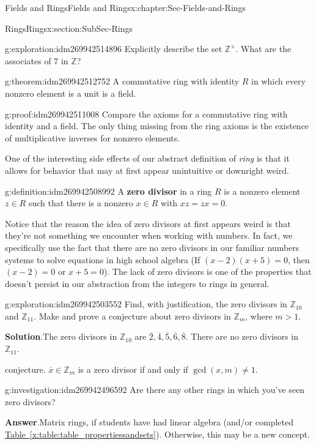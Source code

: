 \documentclass[oneside,10pt,]{book}
\newcommand{\terminology}[1]{\textbf{#1}}
\numberwithin{equation}{section}
\def\Z{{\mathbb Z}}
\begin{document}
\begin{chapterptx}{Fields and Rings}{}{Fields and Rings}{}{}{x:chapter:Sec-Fields-and-Rings}
\begin{sectionptx}{Rings}{}{Rings}{}{}{x:section:SubSec-Rings}
\begin{exploration}{}{g:exploration:idm269942514896}
Explicitly describe the set \(\Z^\times\). What are the associates of 7 in \(\Z\)?%
\end{exploration}
\begin{theorem}{}{}{g:theorem:idm269942512752}%
A commutative ring with identity \(R\) in which every nonzero element is a unit is a field.%
\end{theorem}
\begin{proofptx}{}{g:proof:idm269942511008}
Compare the axioms for a commutative ring with identity and a field. The only thing missing from the ring axioms is the existence of multiplicative inverses for nonzero elements.%
\end{proofptx}
One of the interesting side effects of our abstract definition of \emph{ring} is that it allows for behavior that may at first appear unintuitive or downright weird.%
\begin{definition}{}{g:definition:idm269942508992}%
A \terminology{zero divisor} in a ring \(R\) is a nonzero element \(z\in R\) such that there is a nonzero \(x\in R\) with \(xz = zx = 0\).%
\end{definition}
Notice that the reason the idea of zero divisors at first appears weird is that they're not something we encounter when working with numbers. In fact, we specifically use the fact that there are no zero divisors in our familiar numbers systems to solve equations in high school algebra (If \((x-2)(x+5)=0\), then \((x-2)=0\) or \(x+5=0\)). The lack of zero divisors is one of the properties that doesn't persist in our abstraction from the integers to rings in general.%
\begin{exploration}{}{g:exploration:idm269942503552}%
Find, with justification, the zero divisors in \(\Z_{10}\) and \(\Z_{11}\). Make and prove a conjecture about zero divisors in \(\Z_m\), where \(m > 1\).%
\par\smallskip%
\noindent\textbf{Solution}.\hypertarget{g:solution:idm269942500656}{}\quad{}The zero divisors in \(\Z_{10}\) are \(\overline{2}, \overline{4}, \overline{5}, \overline{6},\overline{8}\). There are no zero divisors in \(\Z_{11}\).%
\par
conjecture. \(\overline{x}\in \Z_m\) is a zero divisor if and only if \(\gcd(x,m) \ne 1\).%
\end{exploration}
\begin{investigation}{}{g:investigation:idm269942496592}%
Are there any other rings in which you've seen zero divisors?%
\par\smallskip%
\noindent\textbf{Answer}.\hypertarget{g:answer:idm269942495408}{}\quad{}Matrix rings, if students have had linear algebra (and\slash{}or completed \hyperref[x:table:table_propertiessandsets]{Table~\ref{x:table:table_propertiessandsets}}). Otherwise, this may be a new concept.%

\end{investigation}
\end{sectionptx}
\end{chapterptx}
\end{document}
